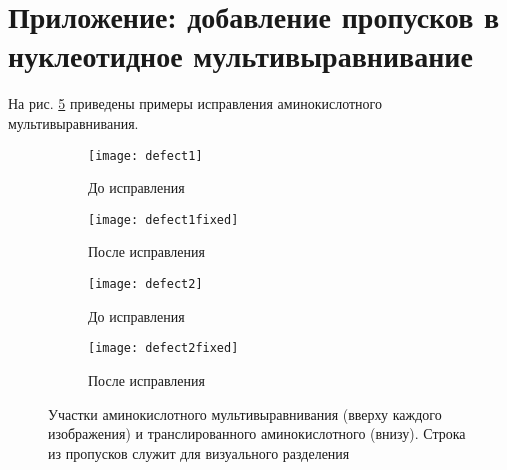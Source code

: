 \documentclass[main.tex]{subfiles}
\begin{document}
	\section{Приложение: добавление пропусков в нуклеотидное мультивыравнивание}
	На рис. \ref{fig:1} приведены примеры исправления аминокислотного мультивыравнивания.
	\begin{figure}[H]
		\centering
		\begin{subfigure}{.5\textwidth}
			\centering
			\texttt{[image: defect1]}
			\caption{До исправления}
			\label{fig:defect1}
		\end{subfigure}%
		\begin{subfigure}{.5\textwidth}
			\centering
			\texttt{[image: defect1fixed]}
			\caption{После исправления}
			\label{fig:defect1fixed}
		\end{subfigure}
	
		\begin{subfigure}{.5\textwidth}
			\centering
			\texttt{[image: defect2]}
			\caption{До исправления}
			\label{fig:defect2}
		\end{subfigure}%
		\begin{subfigure}{.5\textwidth}
			\centering
			\texttt{[image: defect2fixed]}
			\caption{После исправления}
			\label{fig:defect2fixed}
		\end{subfigure}
		\caption{Участки аминокислотного мультивыравнивания (вверху каждого изображения) и транслированного аминокислотного (внизу). Строка из пропусков служит для визуального разделения}
		\label{fig:1}
	\end{figure}
\end{document}
